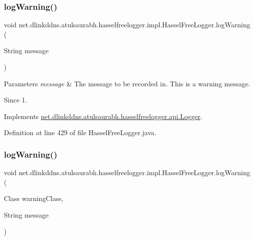 \subsubsection{\texorpdfstring{log\+Warning()}{logWarning()}\hspace{0.1cm}{\footnotesize\ttfamily [1/3]}}
{\footnotesize\ttfamily void net.\+dlinkddns.\+atulsaurabh.\+hasselfreelogger.\+impl.\+Hassel\+Free\+Logger.\+log\+Warning (\begin{DoxyParamCaption}\item[{String}]{message }\end{DoxyParamCaption})}


\begin{DoxyParams}{Parameters}
{\em message} & The message to be recorded in. This is a warning message. \\
\hline
\end{DoxyParams}
\begin{DoxySince}{Since}
1. 
\end{DoxySince}


Implements \mbox{\hyperlink{interfacenet_1_1dlinkddns_1_1atulsaurabh_1_1hasselfreelogger_1_1api_1_1_logger_a7a267e7aa9c678bdb6a3a7ca02a10efd}{net.\+dlinkddns.\+atulsaurabh.\+hasselfreelogger.\+api.\+Logger}}.



Definition at line 429 of file Hassel\+Free\+Logger.\+java.

\mbox{\label{classnet_1_1dlinkddns_1_1atulsaurabh_1_1hasselfreelogger_1_1impl_1_1_hassel_free_logger_ad5f8400bc0ea2500509a4154cfa48bf5}} 
\subsubsection{\texorpdfstring{log\+Warning()}{logWarning()}\hspace{0.1cm}{\footnotesize\ttfamily [2/3]}}
{\footnotesize\ttfamily void net.\+dlinkddns.\+atulsaurabh.\+hasselfreelogger.\+impl.\+Hassel\+Free\+Logger.\+log\+Warning (\begin{DoxyParamCaption}\item[{Class}]{warning\+Class,  }\item[{String}]{message }\end{DoxyParamCaption})}


